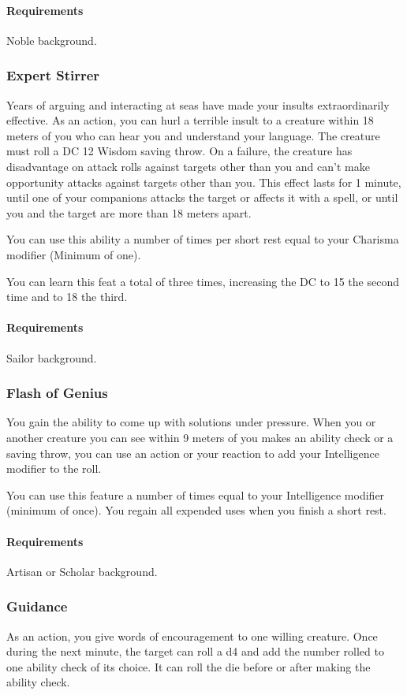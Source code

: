     \paragraph{Requirements} Noble background.
\subsubsection{Expert Stirrer} \label{feat::expertstirrer}
    Years of arguing and interacting at seas have made your insults extraordinarily effective.
    As an action, you can hurl a terrible insult to a creature within 18 meters of you who can hear you and understand your language.
    The creature must roll a DC 12 Wisdom saving throw.
    On a failure, the creature has disadvantage on attack rolls against targets other than you and can't make opportunity attacks against targets other than you.
    This effect lasts for 1 minute, until one of your companions attacks the target or affects it with a spell, or until you and the target are more than 18 meters apart.

    You can use this ability a number of times per short rest equal to your Charisma modifier (Minimum of one).

    You can learn this feat a total of three times, increasing the DC to 15 the second time and to 18 the third.
    \paragraph{Requirements} Sailor background.
\subsubsection{Flash of Genius} \label{feat::flashofgenius}
    You gain the ability to come up with solutions under pressure.
    When you or another creature you can see within 9 meters of you makes an ability check or a saving throw, you can use an action or your reaction to add your Intelligence modifier to the roll.

    You can use this feature a number of times equal to your Intelligence modifier (minimum of once).
    You regain all expended uses when you finish a short rest.
    \paragraph{Requirements} Artisan or Scholar background.
\subsubsection{Guidance} \label{feat::guidance}
    As an action, you give words of encouragement to one willing creature.
    Once during the next minute, the target can roll a d4 and add the number rolled to one ability check of its choice.
    It can roll the die before or after making the ability check.

